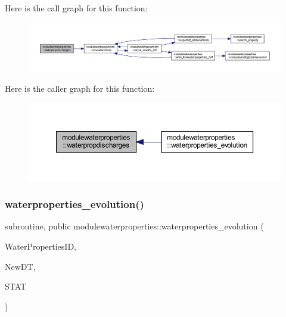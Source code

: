 Here is the call graph for this function\+:\nopagebreak
\begin{figure}[H]
\begin{center}
\leavevmode
\includegraphics[width=350pt]{namespacemodulewaterproperties_a1198b9575d74a6939f38dcaa6c63f476_cgraph}
\end{center}
\end{figure}
Here is the caller graph for this function\+:\nopagebreak
\begin{figure}[H]
\begin{center}
\leavevmode
\includegraphics[width=350pt]{namespacemodulewaterproperties_a1198b9575d74a6939f38dcaa6c63f476_icgraph}
\end{center}
\end{figure}
\mbox{\label{namespacemodulewaterproperties_aa86f63313e6563018f6b05938306a23d}} 
\subsubsection{\texorpdfstring{waterproperties\+\_\+evolution()}{waterproperties\_evolution()}}
{\footnotesize\ttfamily subroutine, public modulewaterproperties\+::waterproperties\+\_\+evolution (\begin{DoxyParamCaption}\item[{integer}]{Water\+Properties\+ID,  }\item[{type(t\+\_\+newdt), intent(out), optional}]{New\+DT,  }\item[{integer, intent(out), optional}]{S\+T\+AT }\end{DoxyParamCaption})}

